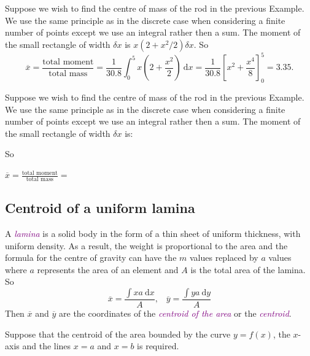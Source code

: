 \documentclass[
  english,
  11pt,
  oneside]{book}
\newcommand{\slide}{}
\theoremstyle{definition}
\theoremstyle{definition}
\theoremstyle{definition}
\theoremstyle{definition}
\theoremstyle{remark}
\begin{document}
\slide

\begin{notslides}

Suppose we wish to find the centre of mass of the rod in the previous Example. We use the same principle as in the discrete case when considering a finite number of points except we use an integral rather then a sum. The moment of the small rectangle of width \(\delta x\) is \(x(2+x^2/2)\delta x\). So
\[\overline x = \frac{\text{total moment}}{\text{total mass}} = \frac{1}{30.8}\int_0^5 x(2+\frac{x^2}{2})\ \mathrm{d}x = \frac{1}{30.8}\left[x^2+\frac{x^4}{8}\right]_0^5 = 3.35.\]

\end{notslides}

\begin{slidesonly}

Suppose we wish to find the centre of mass of the rod in the previous Example. We use the same principle as in the discrete case when considering a finite number of points except we use an integral rather then a sum. The moment of the small rectangle of width \(\delta x\) is:

So

\(\overline x = \displaystyle\frac{\text{total moment}}{\text{total mass}} =\)

\end{slidesonly}

\slide

\subsection{Centroid of a uniform lamina}\label{centroid-of-a-uniform-lamina}

A \textcolor{purple}{\em lamina} is a solid body in the form of a thin sheet of uniform thickness, with uniform density. As a result, the weight is proportional to the area and the formula for the centre of gravity can have the \(m\) values replaced by \(a\) values where \(a\) represents the area of an element and \(A\) is the total area of the lamina. So
\[\overline x = \frac{\displaystyle\int xa\ \mathrm{d}x}{A},\;\;\; \overline y = \frac{\displaystyle\int ya\ \mathrm{d}y}{A}\]
Then \(\overline x\) and \(\overline y\) are the coordinates of the \textcolor{purple}{\em centroid of the area} or the \textcolor{purple}{\em centroid}.

\slide

Suppose that the centroid of the area bounded by the curve \(y=f(x)\), the \(x\)-axis and the lines \(x=a\) and \(x=b\) is required.
\end{document}
